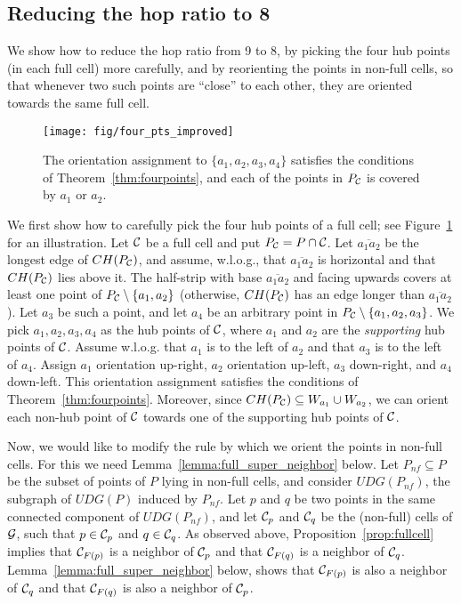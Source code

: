 \documentclass[11pt,letter]{article}
\def\segment#1#2{{\overline{#1#2}}}
\def\wedge#1{{W_{{#1}}}}
\def\clst#1{{\C_{{{F}}({{#1}})}}}
\def\C{{\cal{C}}}
\def\grid{{\cal{G}}}
\def\UDG{{U\!DG}}
\def\nf{{n\!f}}
\begin{document}
\subsection{Reducing the hop ratio to 8}\label{subsec:reducing_hops}

We show how to reduce the hop ratio from 9 to 8, by picking the four hub points (in each full cell) more carefully, and by reorienting the points in non-full cells, so that whenever two such points are ``close'' to each other, they are oriented towards the same full cell.


\begin{figure}[htp]
   \centering
       \texttt{[image: fig/four\_pts\_improved]}
   \caption{The orientation assignment to $\{a_1, a_2, a_3, a_4\}$ satisfies the conditions of Theorem~\ref{thm:fourpoints},
   and each of the points in $P_\C$ is covered by $a_1$ or $a_2$.}
   \label{fig:four_pts_improved}
\end{figure}




We first show how to carefully pick the four hub points of a full cell; see Figure~\ref{fig:four_pts_improved} for an illustration.
Let $\C$ be a full cell and put $P_\C = P \cap \C$. Let $\segment{a_1}{a_2}$ be the longest edge of $CH(P_\C)$, and assume, w.l.o.g., that $\segment{a_1}{a_2}$ is horizontal and that $CH(P_\C)$ lies above it.
The half-strip with base $\segment{a_1}{a_2}$ and facing upwards
covers at least one point of $P_\C \setminus \{a_1,a_2\}$
(otherwise, $CH(P_\C)$ has an edge longer than $\segment{a_1}{a_2}$). Let $a_3$ be such a point, and let $a_4$ be an arbitrary point in
$P_\C \setminus \{a_1,a_2,a_3\}$. We pick $a_1,a_2,a_3,a_4$ as the hub points of $\C$, where
$a_1$ and $a_2$ are the {\em supporting} hub points of $\C$.
Assume w.l.o.g. that $a_1$ is to the left of $a_2$ and that $a_3$ is to the left of $a_4$.
Assign $a_1$ orientation up-right, $a_2$ orientation up-left, $a_3$ down-right, and $a_4$ down-left.
This orientation assignment satisfies the conditions of Theorem~\ref{thm:fourpoints}.
Moreover, since $CH(P_\C) \subseteq \wedge{a_1} \cup \wedge{a_2}$, we can orient each non-hub point of $\C$
towards one of the supporting hub points of $\C$.


Now, we would like to modify the rule by which we orient the points in non-full cells. For this we need Lemma~\ref{lemma:full_super_neighbor} below.
Let $P_{\nf} \subseteq P$ be the subset of points of $P$ lying in non-full cells, and
consider $\UDG(P_{\nf})$, the subgraph of $\UDG(P)$ induced by $P_{\nf}$.
Let $p$ and $q$ be two points in the same connected component of $\UDG(P_{\nf})$,
and let $\C_p$ and $\C_q$ be the (non-full) cells of $\grid$, such that $p \in \C_p$ and $q \in \C_q$.
As observed above, Proposition~\ref{prop:fullcell} implies that $\clst{p}$ is a neighbor of $\C_p$ and that $\clst{q}$ is a neighbor of $\C_q$.
Lemma~\ref{lemma:full_super_neighbor} below, shows that $\clst{p}$ is also a neighbor of $\C_q$ and that $\clst{q}$ is also a neighbor of $\C_p$.
\end{document}
